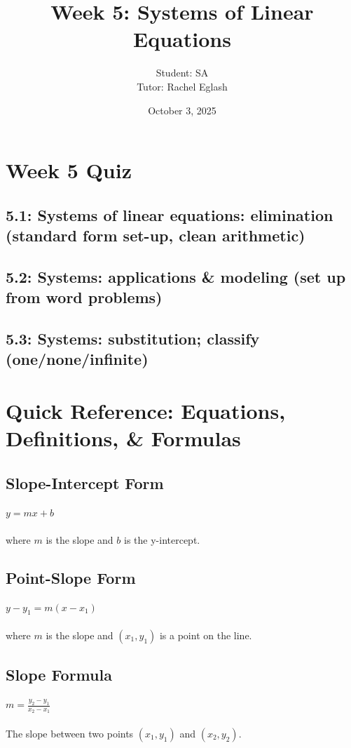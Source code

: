 \documentclass[12pt]{article}
\title{Week 5: Systems of Linear Equations}
\author{
	Student: SA\\
	Tutor: Rachel Eglash}
\date{October 3, 2025}
\begin{document}
	
	\maketitle

	\section*{Week 5 Quiz}
        
        \subsection*{5.1: Systems of linear equations: elimination (standard form set-up, clean arithmetic)}

	    \subsection*{5.2: Systems: applications \& modeling (set up from word problems)}
        
        \subsection*{5.3: Systems: substitution; classify (one/none/infinite)}
	    
            \newpage
	
	\section*{Quick Reference: Equations, Definitions, \& Formulas}
	
        \subsection*{Slope-Intercept Form}
            $y = mx + b$\\\\
            where $m$ is the slope and $b$ is the y-intercept.

	    \subsection*{Point-Slope Form}
        	$y - y_1 = m(x - x_1)$\\\\
            where $m$ is the slope and $(x_1, y_1)$ is a point on the line.
	
	    \subsection*{Slope Formula}
        	$m = \frac{y_2 - y_1}{x_2 - x_1}$\\\\
            The slope between two points $(x_1, y_1)$ and $(x_2, y_2)$.
\end{document}
